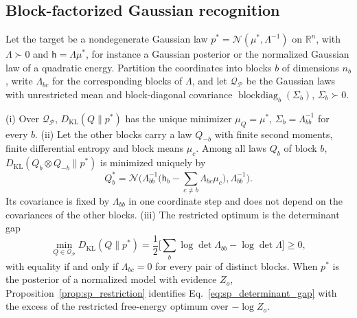 \subsection{Block-factorized Gaussian recognition}\label{app:sp_block_gaussian}
Let the target be a nondegenerate Gaussian law $p^*=\mathcal N(\mu^*,\Lambda^{-1})$ on $\mathbb R^n$, with $\Lambda\succ0$ and $\mathsf h=\Lambda\mu^*$, for instance a Gaussian posterior or the normalized Gaussian law of a quadratic energy. Partition the coordinates into blocks $b$ of dimensions $n_b$, write $\Lambda_{bc}$ for the corresponding blocks of $\Lambda$, and let $\mathcal Q_{\mathcal P}$ be the Gaussian laws with unrestricted mean and block-diagonal covariance $\operatorname{blockdiag}_b(\Sigma_b)$, $\Sigma_b\succ0$.

\begin{proposition}\label{prop:sp_block_gaussian}
(i) Over $\mathcal Q_{\mathcal P}$, $D_{\mathrm{KL}}(Q\|p^*)$ has the unique minimizer $\mu_Q=\mu^*$, $\Sigma_b=\Lambda_{bb}^{-1}$ for every $b$.
(ii) Let the other blocks carry a law $Q_{-b}$ with finite second moments, finite differential entropy and block means $\mu_c$. Among all laws $Q_b$ of block $b$, $D_{\mathrm{KL}}(Q_b\otimes Q_{-b}\|p^*)$ is minimized uniquely by
\begin{equation}
Q_b^*=\mathcal N\Big(\Lambda_{bb}^{-1}\big(\mathsf h_b-\textstyle\sum_{c\neq b}\Lambda_{bc}\mu_c\big),\Lambda_{bb}^{-1}\Big).
\label{eq:sp_block_coordinate}
\end{equation}
Its covariance is fixed by $\Lambda_{bb}$ in one coordinate step and does not depend on the covariances of the other blocks.
(iii) The restricted optimum is the determinant gap
\begin{equation}
\min_{Q\in\mathcal Q_{\mathcal P}}D_{\mathrm{KL}}(Q\|p^*)=\frac12\Big[\sum_b\log\det\Lambda_{bb}-\log\det\Lambda\Big]\geq0,
\label{eq:sp_determinant_gap}
\end{equation}
with equality if and only if $\Lambda_{bc}=0$ for every pair of distinct blocks. When $p^*$ is the posterior of a normalized model with evidence $Z_o$, Proposition~\ref{prop:sp_restriction} identifies Eq.~\eqref{eq:sp_determinant_gap} with the excess of the restricted free-energy optimum over $-\log Z_o$.
\end{proposition}
